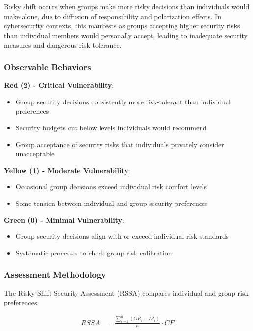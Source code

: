 \documentclass[11pt,a4paper]{article}
\begin{document}
Risky shift occurs when groups make more risky decisions than individuals would make alone, due to diffusion of responsibility and polarization effects. In cybersecurity contexts, this manifests as groups accepting higher security risks than individual members would personally accept, leading to inadequate security measures and dangerous risk tolerance.

\subsubsection{Observable Behaviors}

\textbf{Red (2) - Critical Vulnerability}:
\begin{itemize}
\item Group security decisions consistently more risk-tolerant than individual preferences
\item Security budgets cut below levels individuals would recommend
\item Group acceptance of security risks that individuals privately consider unacceptable
\end{itemize}

\textbf{Yellow (1) - Moderate Vulnerability}:
\begin{itemize}
\item Occasional group decisions exceed individual risk comfort levels
\item Some tension between individual and group security preferences
\end{itemize}

\textbf{Green (0) - Minimal Vulnerability}:
\begin{itemize}
\item Group security decisions align with or exceed individual risk standards
\item Systematic processes to check group risk calibration
\end{itemize}

\subsubsection{Assessment Methodology}

The Risky Shift Security Assessment (RSSA) compares individual and group risk preferences:

\begin{align}
RSSA &= \frac{\sum_{i=1}^{n} (GR_i - IR_i)}{n} \cdot CF
\end{align}
\end{document}
